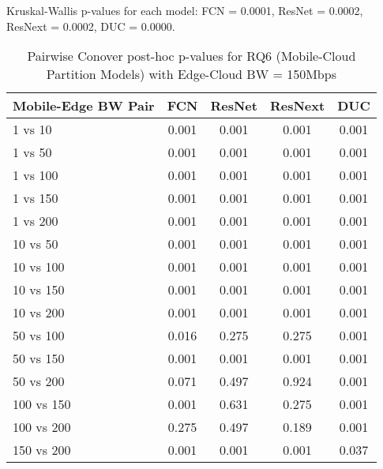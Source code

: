 \begin{table}[h]
\centering
\caption{Pairwise Conover post-hoc p-values for RQ6 (Mobile-Cloud Partition Models) with Edge-Cloud BW = 150Mbps}
\label{tab:conover_mobile_cloud_partition_ec150}
\smallskip
Kruskal-Wallis p-values for each model: FCN = 0.0001, ResNet = 0.0002, ResNext = 0.0002, DUC = 0.0000.

\begin{tabular}{lcccc}
\toprule
Mobile-Edge BW Pair & FCN & ResNet & ResNext & DUC \\
\midrule
1 vs 10 & 0.001 & 0.001 & 0.001 & 0.001 \\
1 vs 50 & 0.001 & 0.001 & 0.001 & 0.001 \\
1 vs 100 & 0.001 & 0.001 & 0.001 & 0.001 \\
1 vs 150 & 0.001 & 0.001 & 0.001 & 0.001 \\
1 vs 200 & 0.001 & 0.001 & 0.001 & 0.001 \\
10 vs 50 & 0.001 & 0.001 & 0.001 & 0.001 \\
10 vs 100 & 0.001 & 0.001 & 0.001 & 0.001 \\
10 vs 150 & 0.001 & 0.001 & 0.001 & 0.001 \\
10 vs 200 & 0.001 & 0.001 & 0.001 & 0.001 \\
50 vs 100 & 0.016 & 0.275 & 0.275 & 0.001 \\
50 vs 150 & 0.001 & 0.001 & 0.001 & 0.001 \\
50 vs 200 & 0.071 & 0.497 & 0.924 & 0.001 \\
100 vs 150 & 0.001 & 0.631 & 0.275 & 0.001 \\
100 vs 200 & 0.275 & 0.497 & 0.189 & 0.001 \\
150 vs 200 & 0.001 & 0.001 & 0.001 & 0.037 \\
\bottomrule
\end{tabular}
\end{table}

